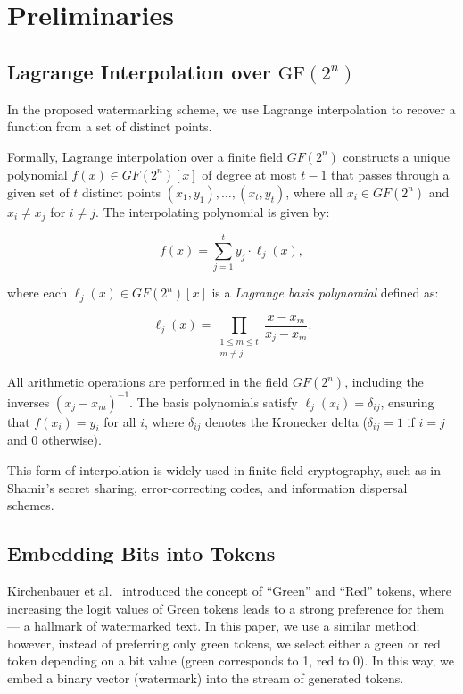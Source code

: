 \documentclass[a4paper,11pt]{llncs}
\newcommand{\GF}{\mathrm{GF}}
\begin{document}
\section{Preliminaries}
\label{sec:building_blocks}


\subsection{Lagrange Interpolation over $\GF(2^n)$}
\label{subsec:lagrante_interpolation}

In the proposed watermarking scheme, we use Lagrange interpolation to recover a function from a set of distinct points.

Formally, Lagrange interpolation over a finite field $GF(2^n)$ constructs a unique polynomial $f(x) \in GF(2^n)[x]$ of degree at most \( t-1 \) that passes through a given set of \( t \) distinct points \( (x_1, y_1), \dots, (x_t, y_t) \), where all $x_i \in GF(2^n)$ and \( x_i \ne x_j \) for \( i \ne j \). The interpolating polynomial is given by:

\[
    f(x) = \sum_{j=1}^{t} y_j \cdot \ell_j(x),
\]

where each $\ell_j(x) \in GF(2^n)[x]$ is a \textit{Lagrange basis polynomial} defined as:

\[
    \ell_j(x) = \prod_{\substack{1 \leq m \leq t \\ m \ne j}} \frac{x - x_m}{x_j - x_m}.
\]

All arithmetic operations are performed in the field $GF(2^n)$, including the inverses $(x_j - x_m)^{-1}$. The basis polynomials satisfy $\ell_j(x_i) = \delta_{ij}$, ensuring that $f(x_i) = y_i$ for all $i$, where $\delta_{ij}$ denotes the Kronecker delta ($\delta_{ij}=1$ if $i=j$ and 0 otherwise).

This form of interpolation is widely used in finite field cryptography, such as in Shamir’s secret sharing, error-correcting codes, and information dispersal schemes.


\subsection{Embedding Bits into Tokens}
\label{subsec:bits_tokens}

Kirchenbauer et al.~\cite{Kirchenbauer_2023} introduced the concept of “Green” and “Red” tokens, where increasing the logit values of Green tokens leads to a strong preference for them --- a hallmark of watermarked text. In this paper, we use a similar method; however, instead of preferring only green tokens, we select either a green or red token depending on a bit value (green corresponds to 1, red to 0). In this way, we embed a binary vector (watermark) into the stream of generated tokens.
\end{document}
